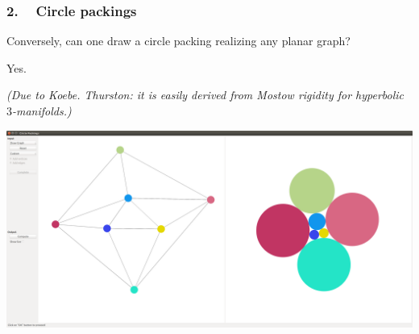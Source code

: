 \begin{frame}
\frametitle{2. ~ Circle packings}


\medskip 
Conversely, can one draw a circle packing realizing any planar graph?

\smallskip \pause
\begin{theorem}
\pause Yes.
\end{theorem}

\smallskip \pause
\emph{\small (Due to Koebe. Thurston: it is easily derived from Mostow rigidity for hyperbolic $3$-manifolds.)}



\medskip \pause
\begin{center}
\includegraphics[width=\textwidth]{Screenshot1-c.png}
\end{center}

\end{frame}